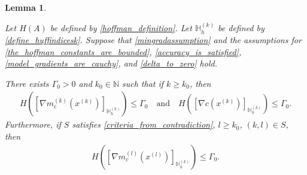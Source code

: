 \documentclass{article}
\newtheorem{lemma}[theorem]{Lemma}
\theoremstyle{case}
\numberwithin{theorem}{subsection}
\newcommand{\huff}{{\Gamma_0}}
\newcommand{\naturals}{\mathbb N}
\newcommand{\xk}{x^{(k)}}
\newcommand{\xl}{{x^{(l)}}}
\newcommand{\huffindicesk}{{ \mathbb H_h^{(k)} }}
\newcommand{\modeljack}{{ \nabla m^{(k)}_{c}\left(\xk\right) }}
\newcommand{\modeljacl}{{ \nabla m^{(l)}_{c}\left(\xl\right) }}
\newcommand{\truejack}{{ \nabla c\left(\xk\right) }}
\begin{document}
\begin{lemma}
\label{huffman_constants_of_hoffman_indices_are_bounded}

Let $H(A)$ be defined by \cref{hoffman_definition}.
Let $\huffindicesk$ be defined by \cref{define_huffindicesk}.
Suppose that 
\cref{mingradassumption}
and the assumptions for
\cref{the_hoffman_constants_are_bounded}, \cref{accuracy_is_satisfied}, \cref{model_gradients_are_cauchy}, and \cref{delta_to_zero}
hold.

There exists $\huff > 0$ and $k_0 \in \naturals$ such that if $k \ge k_0$, then
\begin{align*}
H\left(\left[\modeljack\right]_{\huffindicesk}\right) \le \huff
\quad \textrm{and} \quad
H\left(\left[\truejack\right]_{\huffindicesk}\right) \le \huff.
\end{align*}
Furthermore, if $S$ satisfies \cref{criteria_from_contradiction}, $l \ge k_0$, $(k, l) \in S$, then
\begin{align*}
H\left(\left[\modeljacl\right]_{\huffindicesk}\right) \le \huff.
\end{align*}
\end{lemma}
\end{document}
